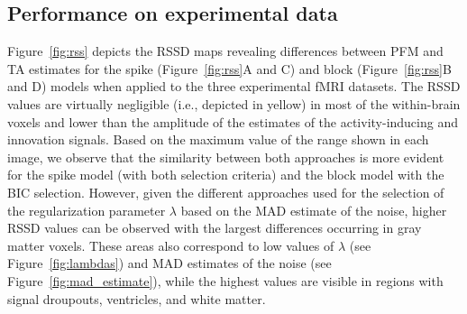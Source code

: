 
\subsection{Performance on experimental data}

Figure~\ref{fig:rss} depicts the RSSD maps revealing differences between PFM and
TA estimates for the spike (Figure~\ref{fig:rss}A and C) and block
(Figure~\ref{fig:rss}B and D) models when applied to the three experimental fMRI
datasets. The RSSD values are virtually negligible (i.e., depicted in yellow) in
most of the within-brain voxels and lower than the amplitude of the estimates of
the activity-inducing and innovation signals. Based on the maximum value of the
range shown in each image, we observe that the similarity between both
approaches is more evident for the spike model (with both selection criteria)
and the block model with the BIC selection. However, given the different
approaches used for the selection of the regularization parameter $\lambda$
based on the MAD estimate of the noise, higher RSSD values can be observed with
the largest differences occurring in gray matter voxels. These areas also
correspond to low values of $\lambda$ (see Figure~\ref{fig:lambdas}) and MAD
estimates of the noise (see Figure~\ref{fig:mad_estimate}), while the highest
values are visible in regions with signal droupouts, ventricles, and white
matter.

